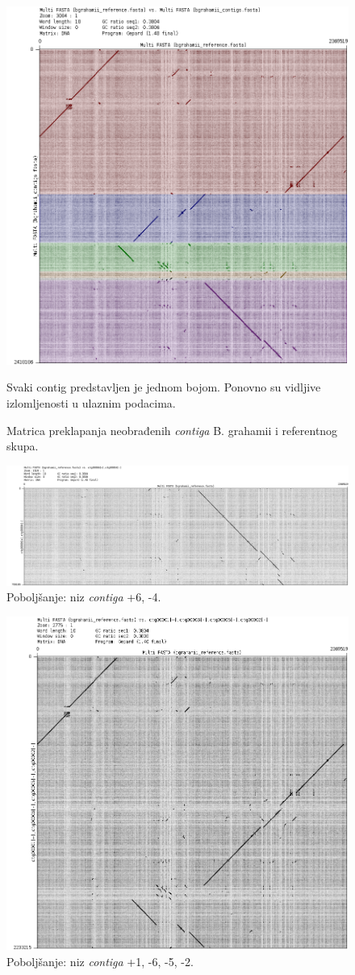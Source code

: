 \documentclass[times, utf8, seminar, numeric]{fer}
\begin{document}
\begin{figure}[h]
	\centering
	\centerline{\includegraphics[width=0.6\linewidth]{img/bh_contigs}}
	\caption{Matrica preklapanja neobrađenih \textit{contiga} B. grahamii i referentnog skupa.}
	\label{fig:bhcontigs}
	\small
	Svaki contig predstavljen je jednom bojom. Ponovno su vidljive izlomljenosti u ulaznim podacima.
\end{figure}

\begin{figure}[h]
	\centering
	\centerline{\includegraphics[width=0.6\linewidth]{img/bh_6_4}}
	\caption{Poboljšanje: niz \textit{contiga} +6, -4.}
	\label{fig:bh64}
\end{figure}

\begin{figure}[h]
	\centering
	\centerline{\includegraphics[width=0.6\linewidth]{img/bh_1_6_2}}
	\caption{Poboljšanje: niz \textit{contiga} +1, -6, -5, -2.}
	\label{fig:bh162}
\end{figure}
\end{document}
